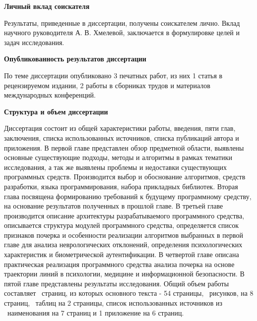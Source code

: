 \bigskip
\textbf{Личный вклад соискателя}
\bigskip

Результаты, приведенные в диссертации, получены  соискателем лично. Вклад научного руководителя А. В. Хмелевой, заключается в формулировке целей и задач исследования.

\bigskip
\textbf{Опубликованность результатов диссертации}
\bigskip

По теме диссертации опубликовано 3 печатных работ, из них 1 статья в рецензируемом издании, 2 работы в сборниках трудов и материалов международных конференций.

\bigskip
\textbf{Структура и объем диссертации}
\bigskip

Диссертация состоит из общей характеристики работы, введения, пяти глав, заключения, списка использованных источников, списка публикаций автора и приложения. В первой главе представлен обзор предметной области, выявлены основные существующие подходы, методы и алгоритмы в рамках тематики исследования, а так же выявлены проблемы и недоставки существующих программных средств. Производится выбор и обоснование алгоритмов, средств разработки, языка программирования, набора прикладных библиотек. Вторая глава посвящена формированию требований к будущему программному средству, на основание результатов полученных в прошлой главе. В третьей главе производится описание архитектуры разрабатываемого программного средства, описывается структура модулей программного средства, определяется список признаков почерка и особенности реализации алгоритмов выбранных в первой главе для анализа неврологических отклонений, определения психологических характеристик и биометрической аутентификации. В четвертой главе описана практическая реализация программного средства анализа почерка на основе траектории линий в психологии, медицине и информационной безопасности. В пятой главе представлены результаты исследования.
Общий объем работы составляет \totpages~страниц, из которых основного текста - 54 страницы, \totfig{}~рисунков, на 8 страниц, \tottab{}~таблиц на 2 страницы, список использованных источников из \totref{}~наименования на 7 страниц и 1 приложение на 6 страниц.